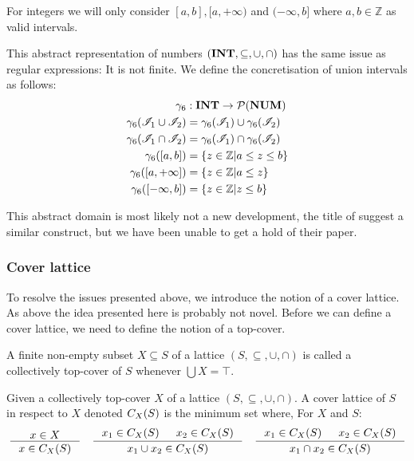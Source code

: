 For integers we will only consider $[a, b], [a, +\infty)$ and $(-\infty, b]$ where $a, b \in \mathbb{Z}$ as valid intervals.

This abstract representation of numbers $(\mathbf{INT}, \subseteq, \cup, \cap)$ has the same issue as regular expressions: It is not finite.
We define the concretisation of union intervals as follows:
\begin{align}
    \gamma_6 &: \mathbf{INT} \rightarrow \mathcal{P}(\mathbf{NUM}) \\
    \gamma_6(\mathscr{I}_1 \cup \mathscr{I}_2) &= \gamma_6(\mathscr{I}_1) \cup \gamma_6(\mathscr{I}_2) \\
    \gamma_6(\mathscr{I}_1 \cap \mathscr{I}_2) &= \gamma_6(\mathscr{I}_1) \cap \gamma_6(\mathscr{I}_2) \\
    \gamma_6([a, b]) &= \left\{ z \in \mathbb{Z} \middle| a \leq z \leq b \right\} \\
    \gamma_6([a, +\infty]) &= \left\{ z \in \mathbb{Z} \middle| a \leq z \right\} \\
    \gamma_6([-\infty, b]) &= \left\{ z \in \mathbb{Z} \middle| z \leq b \right\}
\end{align}

This abstract domain is most likely not a new development, the title of \cite{li2010abstract} suggest a similar construct, but we have been unable to get a hold of their paper.

\subsubsection{Cover lattice}\label{sec:cover-lattice}
To resolve the issues presented above, we introduce the notion of a cover lattice.
As above the idea presented here is probably not novel.
Before we can define a cover lattice, we need to define the notion of a top-cover.

\begin{definition}
    A finite non-empty subset $X \subseteq S$ of a lattice $(S, \subseteq, \cup, \cap)$ is called a collectively top-cover of $S$ whenever $\bigcup X = \top$.
\end{definition}

\begin{definition}\label{def:coverlattice}
Given a collectively top-cover $X$ of a lattice $(S, \subseteq, \cup, \cap)$.
A cover lattice of $S$ in respect to $X$ denoted $C_{X}(S)$ is the minimum set where,
For $X$ and $S$:
\begin{align}
    \inference{x \in X}{x \in C_X(S)} \quad
    \inference{x_1 \in C_X(S) & x_2 \in C_X(S)}{x_1 \cup  x_2 \in C_X(S)} \quad
    \inference{x_1 \in C_X(S) & x_2 \in C_X(S)}{x_1 \cap  x_2 \in C_X(S)}
\end{align}
\end{definition}


